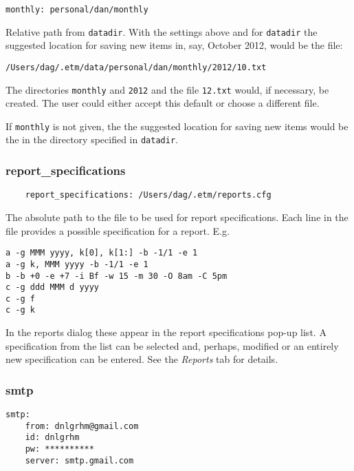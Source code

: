 \documentclass[]{article}
\begin{document}
\begin{verbatim}
monthly: personal/dan/monthly
\end{verbatim}

Relative path from \texttt{datadir}. With the settings above and for
\texttt{datadir} the suggested location for saving new items in, say,
October 2012, would be the file:

\begin{verbatim}
/Users/dag/.etm/data/personal/dan/monthly/2012/10.txt
\end{verbatim}

The directories \texttt{monthly} and \texttt{2012} and the file
\texttt{12.txt} would, if necessary, be created. The user could either
accept this default or choose a different file.

If \texttt{monthly} is not given, the the suggested location for saving
new items would be the in the directory specified in \texttt{datadir}.

\subsubsection{report\_specifications}

\begin{verbatim}
    report_specifications: /Users/dag/.etm/reports.cfg
\end{verbatim}

The absolute path to the file to be used for report specifications. Each
line in the file provides a possible specification for a report. E.g.

\begin{verbatim}
a -g MMM yyyy, k[0], k[1:] -b -1/1 -e 1
a -g k, MMM yyyy -b -1/1 -e 1
b -b +0 -e +7 -i Bf -w 15 -m 30 -O 8am -C 5pm
c -g ddd MMM d yyyy
c -g f
c -g k
\end{verbatim}

In the reports dialog these appear in the report specifications pop-up
list. A specification from the list can be selected and, perhaps,
modified or an entirely new specification can be entered. See the
\emph{Reports} tab for details.

\subsubsection{smtp}

\begin{verbatim}
smtp:
    from: dnlgrhm@gmail.com
    id: dnlgrhm
    pw: **********
    server: smtp.gmail.com
\end{verbatim}
\end{document}
